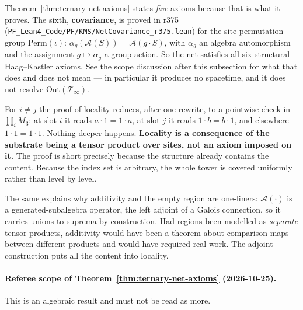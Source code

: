 \begin{remark}
Theorem~\ref{thm:ternary-net-axioms} states \emph{five} axioms because that is
what it proves. The sixth, \textbf{covariance}, is proved in r375
(\texttt{PF\_Lean4\_Code/PF/KMS/NetCovariance\_r375.lean}) for the
site-permutation group $\mathrm{Perm}(\iota)$: $\alpha_g(\mathcal{A}(S)) =
\mathcal{A}(g\cdot S)$, with $\alpha_g$ an algebra automorphism and the
assignment $g \mapsto \alpha_g$ a group action. So the net satisfies all six
structural Haag--Kastler axioms. See the scope discussion after this
subsection for what that does and does not mean --- in particular it produces
no spacetime, and it does not resolve
$\mathrm{Out}(\mathcal{T}_\infty)$.
\end{remark}

\begin{level2}
For $i \neq j$ the proof of locality reduces, after one rewrite, to a pointwise
check in $\prod_i M_3$: at slot $i$ it reads $a\cdot 1 = 1 \cdot a$, at slot $j$
it reads $1 \cdot b = b \cdot 1$, and elsewhere $1 \cdot 1 = 1 \cdot 1$. Nothing
deeper happens. \textbf{Locality is a consequence of the substrate being a
tensor product over sites, not an axiom imposed on it.} The proof is short
precisely because the structure already contains the content. Because the index
set is arbitrary, the whole tower is covered uniformly rather than level by
level.

The same explains why additivity and the empty region are one-liners:
$\mathcal{A}(\cdot)$ is a generated-subalgebra operator, the left adjoint of a
Galois connection, so it carries unions to suprema by construction. Had regions
been modelled as \emph{separate} tensor products, additivity would have been a
theorem about comparison maps between different products and would have required
real work. The adjoint construction puts all the content into locality.
\end{level2}

\paragraph{Referee scope of Theorem~\ref{thm:ternary-net-axioms} (2026-10-25).}
This is an algebraic result and must not be read as more.

